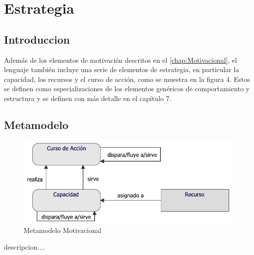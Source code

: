 \chapter{Estrategia}
\section{Introduccion}
Además de los elementos de motivación descritos en el \ref{chap:Motivacional}, el lenguaje también incluye una serie de elementos de estrategia, en particular la capacidad, los recursos y el curso de acción, como se muestra en la figura 4. Estos se definen como especializaciones de los elementos genéricos de comportamiento y estructura y se definen con más detalle en el capítulo 7.

\newpage

\section{Metamodelo}
\begin{figure}[h!]
	\centering
	\includegraphics[width=0.9\linewidth]{imgs/meta/Estrategia}
	\caption{Metamodelo Motivacional}
\end{figure}

descripcion....

\newpage


\newpage



\newpage


\newpage


